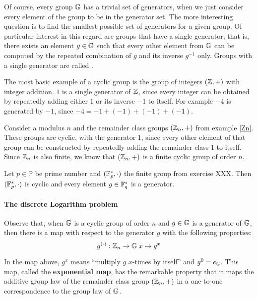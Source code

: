 Of course, every group $\mathbb{G}$ has a trivial set of generators, when we just consider every element of the group to be in the generator set. The more interesting question is to find the smallest possible set of generators for a given group. Of particular interest in this regard are groups that have a single generator, that is, there exists an element $g\in\mathbb{G}$ such that every other element from $\mathbb{G}$ can be computed by the repeated combination of $g$ and its inverse $g^{-1}$ only. Groups with a single generator are called .\label{cyclic-groups}
\begin{example} The most basic example of a cyclic group is the group of integers $(\mathbb{Z},+)$ with integer addition. $1$ is a single generator of $\mathbb{Z}$, since every integer can be obtained by repeatedly adding either $1$ or its inverse $-1$ to itself. For example
$-4$ is generated by $-1$, since $-4=-1+(-1)+(-1)+(-1)$.
\end{example}
\begin{example} Consider a modulus $n$ and the remainder class groups $(\mathbb{Z}_n,+)$ from example \ref{Zn}. These groups are cyclic, with the generator $1$, since every other element of that group can be constructed by repeatedly adding the remainder class $1$ to itself. Since $\mathbb{Z}_n$ is also finite, we know that $(\mathbb{Z}_n,+)$ is a finite cyclic group of order $n$.
\end{example}
\begin{example}\label{ex:modulus-prime-group} Let $p\in\mathbb{P}$ be prime number and $(\mathbb{F}_p^*,\cdot)$ the finite group from exercise XXX. Then $(\mathbb{F}_p^*,\cdot)$ is cyclic and every element $g\in\mathbb{F}_q^*$ is a generator.
\end{example}
\paragraph{The discrete Logarithm problem}
Observe that, when
$\mathbb{G}$ is a cyclic group of order $n$ and $g\in \mathbb{G}$ is a generator of $\mathbb{G}$, then there is a map with respect to the generator $g$ with the following properties:
\begin{equation}\label{exponentialmap}
g^{(\cdot)}: \mathbb{Z}_n \to \mathbb{G}\; x \mapsto g^x
\end{equation}

In the map above,  $g^x$ means ``multiply $g$ $x$-times by itself'' and $g^0=e_{\mathbb{G}}$. This map, called the \textbf{exponential map}, has the remarkable property that it maps the additive group law of the remainder class group $(\mathbb{Z}_n,+)$ in a one-to-one correspondence to the group law of $\mathbb{G}$.

